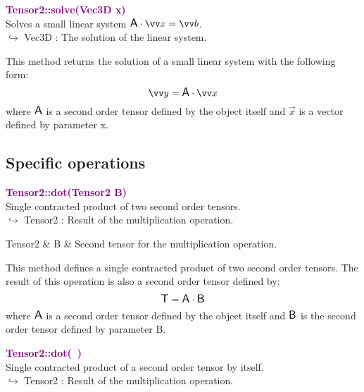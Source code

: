 \textcolor{purple}{\textbf{Tensor2::solve(Vec3D x)}}\label{Tensor2::solve(Vec3D x)}\\
Solves a small linear system $\A\cdot \overrightarrow{x} = \overrightarrow{b}$.\\ \hspace*{10mm}$\hookrightarrow$ Vec3D : The solution of the linear system.

This method returns the solution of a small linear system with the following form:
\begin{equation*}
\overrightarrow{y} = \A \cdot \overrightarrow{x}
\end{equation*}
where $\mbox{\large\ensuremath{\mathsf{A}}}$ is a second order tensor defined by the object itself and $\overrightarrow{x}$ is a vector defined by parameter x.

\subsection{Specific operations}

\textcolor{purple}{\textbf{Tensor2::dot(Tensor2 B)}}\label{Tensor2::dot(Tensor2 B)}\\
Single contracted product of two second order tensors.\\ \hspace*{10mm}$\hookrightarrow$ Tensor2 : Result of the multiplication operation.

\begin{tcolorbox}[width=\textwidth,myArgs,tabularx={ll|R}]
Tensor2 & B & Second tensor for the multiplication operation.
\end{tcolorbox}

This method defines a single contracted product of two second order tensors.
The result of this operation is also a second order tensor defined by:
\begin{equation*}
\mbox{\large\ensuremath{\mathsf{T}}} = \mbox{\large\ensuremath{\mathsf{A}}} \cdot \mbox{\large\ensuremath{\mathsf{B}}}
\end{equation*}
where $\mbox{\large\ensuremath{\mathsf{A}}}$ is a second order tensor defined by the object itself and $\mbox{\large\ensuremath{\mathsf{B}}}$ is the second order tensor defined by parameter B.

\textcolor{purple}{\textbf{Tensor2::dot(~)}}\label{Tensor2::dot()}\\
Single contracted product of a second order tensor by itself.\\ \hspace*{10mm}$\hookrightarrow$ Tensor2 : Result of the multiplication operation.

